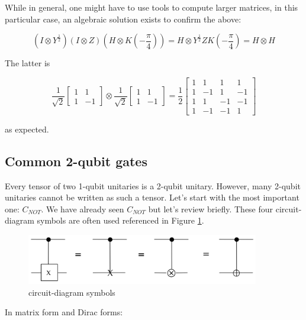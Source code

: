 \documentclass[main.tex]{subfiles}
\begin{document}
    While in general, one might have to use tools to compute larger matrices, in this particular case, an algebraic solution exists to confirm the above:
    
    $$
    \left(I \otimes Y^{\frac{1}{2}}\right)(I \otimes Z)\left(H \otimes K\left(-\frac{\pi}{4}\right)\right)=H \otimes Y^{\frac{1}{2}} Z K\left(-\frac{\pi}{4}\right)=H \otimes H
    $$
    
    The latter is
    
    $$
    \frac{1}{\sqrt{2}}\left[\begin{array}{cc}
    1 & 1 \\
    1 & -1
    \end{array}\right] \otimes \frac{1}{\sqrt{2}}\left[\begin{array}{cc}
    1 & 1 \\
    1 & -1
    \end{array}\right]=\frac{1}{2}\left[\begin{array}{cccc}
    1 & 1 & 1 & 1 \\
    1 & -1 & 1 & -1 \\
    1 & 1 & -1 & -1 \\
    1 & -1 & -1 & 1
    \end{array}\right]
    $$
    
    as expected.

\subsection{Common 2-qubit gates}

    Every tensor of two 1-qubit unitaries is a 2-qubit unitary. However, many 2-qubit unitaries cannot be written as such a tensor. Let's start with the most important one: $C_{NOT}$. We have already seen $C_{N O T}$ but let's review briefly. These four circuit-diagram symbols are often used referenced in Figure \ref{fig:17cnot}.
    
    \begin{figure}
        \centering
        \includegraphics[width=4in]{notes/figs/n08/17cnot.png}
        \caption{circuit-diagram symbols}
        \label{fig:17cnot}
    \end{figure}
    
    In matrix form and Dirac forms:
    
\end{document}
